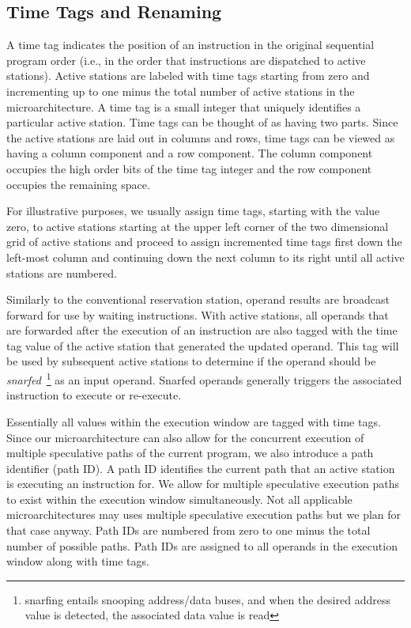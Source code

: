 \documentclass[10pt,dvips]{article}
\begin{document}
\subsection{Time Tags and Renaming}
%
A time tag indicates
the position of an instruction in the original 
sequential program order (i.e., in the order that instructions are 
dispatched
to active stations).  
Active stations are labeled with time tags starting
from zero and incrementing up to one minus the total number of
active stations in the microarchitecture.  
A time tag is a small
integer that uniquely identifies a particular active station.
Time tags can be thought of as having two
parts.  Since the active stations are laid out
in columns and rows, time tags can be viewed as having a column
component and a row component.  The column component 
occupies the high order bits of
the time tag integer and the row component occupies the remaining space.

For illustrative purposes, we usually assign time tags, starting with the
value zero,
to active stations starting at the upper left corner of the two
dimensional grid of active stations and proceed to assign incremented
time tags first down the left-most column and continuing down the
next column to its right until all active stations are numbered.

Similarly to the conventional reservation station, operand results
are broadcast forward for use by waiting instructions.
With active stations, all operands that are forwarded after the execution
of an instruction are also tagged with the time tag value of the
active station that generated the updated operand.
This tag will be used by subsequent active stations to determine if
the operand should be {\em snarfed}~\footnote{snarfing entails snooping
address/data buses, and when the desired address value is detected, 
the associated data value is read} 
as an input operand.
Snarfed operands generally triggers the
associated instruction to
execute or re-execute.

Essentially all values within the execution
window are tagged with time tags.
Since our microarchitecture can also allow for the concurrent
execution of multiple speculative paths of the current program,
we also introduce a path identifier (path ID).
A path ID 
identifies the current path that an active station 
is executing an instruction for.  
We allow for multiple speculative execution paths to
exist within the execution window 
simultaneously.
Not all applicable microarchitectures may uses multiple speculative
execution paths but we plan for that case anyway.
Path IDs are numbered from zero
to one minus the total number of possible paths.
Path IDs are assigned to all operands in the execution window
along with time tags.
\end{document}
